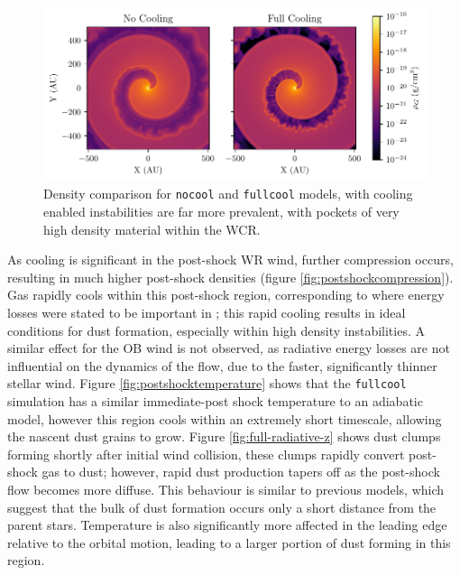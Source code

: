 \documentclass[fleqn,usenatbib]{mnras}
\begin{document}
\begin{figure}
  \centering
  \includegraphics[width=\linewidth]{assets/results/radiative/radiative-rho.pdf}
  \caption[Instabilities due to cooling]{Density comparison for \texttt{nocool} and \texttt{fullcool} models, with cooling enabled instabilities are far more prevalent, with pockets of very high density material within the WCR.}
  \label{fig:coolingprocess-density}
\end{figure}



As cooling is significant in the post-shock WR wind, further compression occurs, resulting in much higher post-shock densities (figure \ref{fig:postshockcompression}).
Gas rapidly cools within this post-shock region, corresponding to where energy losses were stated to be important in \cite{usov_stellar_1991}; this rapid cooling results in ideal conditions for dust formation, especially within high density instabilities.
A similar effect for the OB wind is not observed, as radiative energy losses are not influential on the dynamics of the flow, due to the faster, significantly thinner stellar wind.
Figure \ref{fig:postshocktemperature} shows that the \texttt{fullcool} simulation has a similar immediate-post shock temperature to an adiabatic model, however this region cools within an extremely short timescale, allowing the nascent dust grains to grow.
Figure \ref{fig:full-radiative-z} shows dust clumps forming shortly after initial wind collision, these clumps rapidly convert post-shock gas to dust; however, rapid dust production tapers off as the post-shock flow becomes more diffuse.
This behaviour is similar to previous models, which suggest that the bulk of dust formation occurs only a short distance from the parent stars.
Temperature is also significantly more affected in the leading edge relative to the orbital motion, leading to a larger portion of dust forming in this region.
\end{document}
